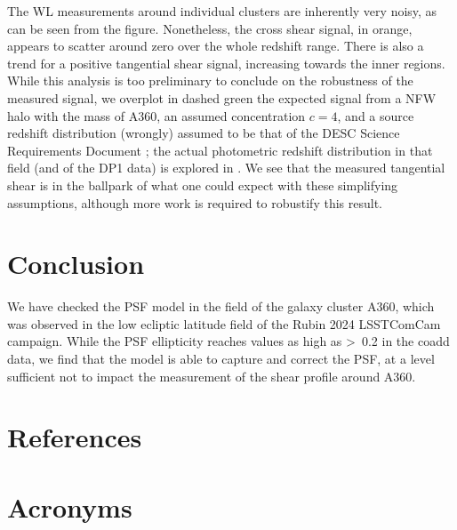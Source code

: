 \documentclass[SE,lsstdraft,authoryear,toc]{lsstdoc}
\begin{document}
The WL measurements around individual clusters are inherently very noisy, as can be seen from the figure. Nonetheless, the cross shear signal, in orange, appears to scatter around zero over the whole redshift range. There is also a trend for a positive tangential shear signal, increasing towards the inner regions. While this analysis is too preliminary to conclude on the robustness of the measured signal, we overplot in dashed green the expected signal from a NFW halo with the mass of A360, an assumed concentration $c=4$, and a source redshift distribution (wrongly) assumed to be that of the DESC Science Requirements Document \citep{2018arXiv180901669T}; the actual photometric redshift distribution in that field (and of the DP1 data) is explored in . We see that the measured tangential shear is in the ballpark of what one could expect with these simplifying assumptions, although more work is required to robustify this result.


\section{Conclusion}
We have checked the PSF model in the field of the galaxy cluster A360, which was observed in the low ecliptic latitude field of the Rubin 2024 LSSTComCam campaign. While the PSF ellipticity reaches values as high as >~0.2 in the coadd data, we find that the model is able to capture and correct the PSF, at a level sufficient not to impact the measurement of the shear profile around A360. 


\appendix
\section{References} \label{sec:bib}
\renewcommand{\refname}{} %


\section{Acronyms} \label{sec:acronyms}

\end{document}
